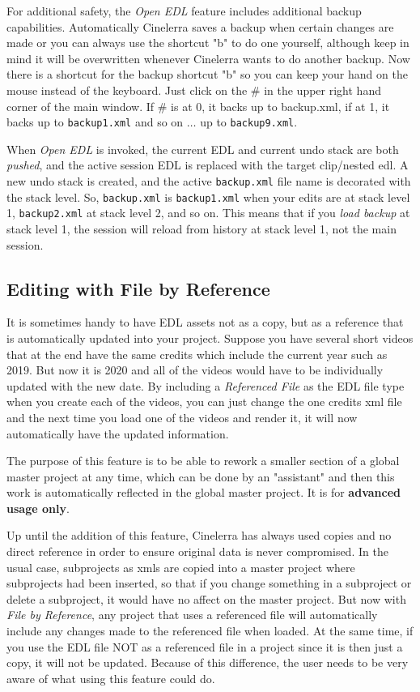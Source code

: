 For additional safety, the \textit{Open EDL} feature includes additional backup capabilities. Automatically Cinelerra saves a backup when certain changes are made or you can always use the shortcut "b" to do one yourself, although keep in mind it will be overwritten whenever Cinelerra wants to do another backup.  Now there is a shortcut for the backup shortcut "b" so you can keep your hand on the mouse instead of the keyboard.  Just click on the \# in the upper right hand corner of the main window.  If \# is at 0, it backs up to backup.xml, if at 1, it backs up to \texttt{backup1.xml} and so on $\dots$ up to \texttt{backup9.xml}.

When \textit{Open EDL} is invoked, the current EDL and current undo stack are both \textit{pushed}, and the active session EDL is replaced with the target clip/nested edl.  A new undo stack is created, and the active \texttt{backup.xml} file name is decorated with the stack level.  So, \texttt{backup.xml} is \texttt{backup1.xml} when your edits are at stack level 1, \texttt{backup2.xml} at stack level 2, and so on.  This means that if you \textit{load backup} at stack level 1, the session will reload from history at stack level 1, not the main session.

\subsection{Editing with File by Reference}%
\label{sub:file-reference}

It is sometimes handy to have EDL assets not as a copy, but as a reference that is
automatically updated into your project.  Suppose you have several short videos that at
the end have the same credits which include the current year such as 2019.  But now it 
is 2020 and all of the videos would have to be individually updated with the new date.
By including a \textit{Referenced File} as the EDL file type when you create each of the videos, 
you can just change the one credits xml file and the next time you load one of the 
videos and render it, it will now automatically have the updated information. 

The purpose of this feature is to be able to rework a smaller section of a global 
master project at any time, which can be done by an "assistant" and then this work 
is automatically reflected in the global master project.  It is for \textbf{advanced usage only}.

Up until the addition of this feature, Cinelerra has always used copies and no 
direct reference in order to ensure original data is never compromised.  In the 
usual case, subprojects as xmls are copied into a master project where subprojects 
had been inserted, so that if you change something in a subproject or delete a subproject,
it would have no affect on the master project.  But now with \textit{File by Reference}, any
project that uses a referenced file will automatically include any changes made to the
referenced file when loaded.  At the same time, if you use the EDL file NOT as a
referenced file in a project since it is then just a copy, it will not be updated. 
Because of this difference, the user needs to be very aware of what using this feature 
could do.

